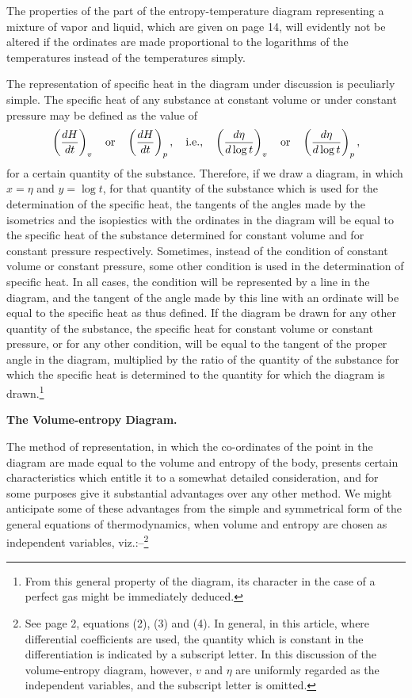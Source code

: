 \documentclass[11pt]{article}
\begin{document}
The properties of the part of the entropy-temperature diagram representing a mixture of vapor and liquid, which are given on page 14, will evidently not be altered if the ordinates are made proportional to the logarithms of the temperatures instead of the temperatures simply.

The representation of specific heat in the diagram under discussion is peculiarly simple. The specific heat of any substance at constant volume or under constant pressure may be defined as the value of
\[
\left(\frac{dH}{dt}\right)_v
\quad\hbox{or}\quad
\left(\frac{dH}{dt}\right)_p,
\quad\hbox{i.e.,}\quad
\left(\frac{d\eta}{d\log t}\right)_v
\quad\hbox{or}\quad
\left(\frac{d\eta}{d\log t}\right)_p,
\]
for a certain quantity of the substance. Therefore, if we draw a diagram, in which $x=\eta$ and $y=\log t$, for that quantity of the substance which is used for the determination of the specific heat, the tangents of the angles made by the isometrics and the isopiestics with the ordinates in the diagram will be equal to the specific heat of the substance determined for constant volume and for constant pressure respectively. Sometimes, instead of the condition of constant volume or constant pressure, some other condition is used in the determination of specific heat. In all cases, the condition will be represented by a line in the diagram, and the tangent of the angle made by this line with an ordinate will be equal to the specific heat as thus defined. If the diagram be drawn for any other quantity of the substance, the specific heat for constant volume or constant pressure, or for any other condition, will be equal to the tangent of the proper angle in the diagram, multiplied by the ratio of the quantity of the substance for which the specific heat is determined to the quantity for which the diagram is drawn.\footnote{From this general property of the diagram, its character in the case of a perfect gas might be immediately deduced.}

\begin{center}
\bfseries The Volume-entropy Diagram.
\end{center}

The method of representation, in which the co-ordinates of the point in the diagram are made equal to the volume and entropy of the body, presents certain characteristics which entitle it to a somewhat detailed consideration, and for some purposes give it substantial advantages over any other method. We might anticipate some of these advantages from the simple and symmetrical form of the general equations of thermodynamics, when volume and entropy are chosen as independent variables, viz.:--\footnote{See page 2, equations (2), (3) and (4). In general, in this article, where differential coefficients are used, the quantity which is constant in the differentiation is indicated by a subscript letter. In this discussion of the volume-entropy diagram, however, $v$ and $\eta$ are uniformly regarded as the independent variables, and the subscript letter is omitted.}
\end{document}
